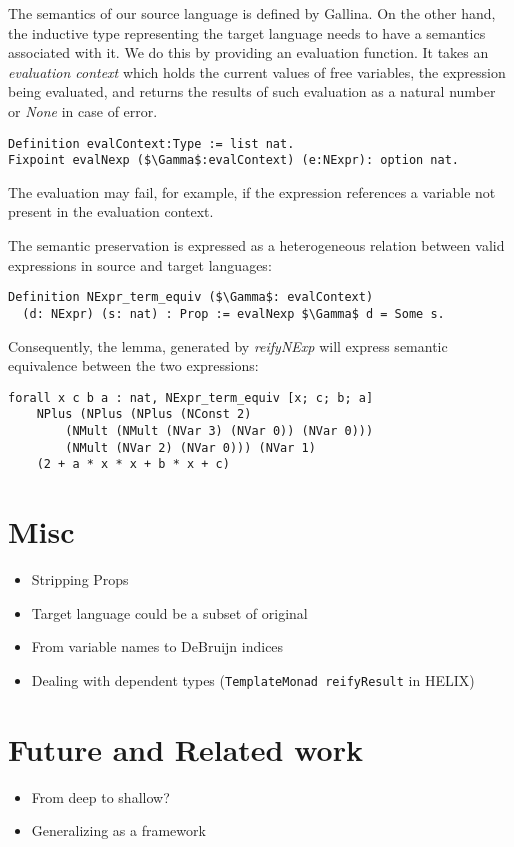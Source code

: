 \documentclass[sigplan]{acmart}\settopmatter{printfolios=true,printccs=false,printacmref=false}
\begin{document}
The semantics of our source language is defined by Gallina. On the
other hand, the inductive type representing the target language needs
to have a semantics associated with it. We do this by providing an
evaluation function. It takes an \textit{evaluation context} which
holds the current values of free variables, the expression being
evaluated, and returns the results of such evaluation as a natural
number or \emph{None} in case of error.

\begin{lstlisting}[language=Coq, mathescape=true,
  frame=single, basicstyle=\footnotesize]
Definition evalContext:Type := list nat.
Fixpoint evalNexp ($\Gamma$:evalContext) (e:NExpr): option nat.
\end{lstlisting}

The evaluation may fail, for example, if the expression references a
variable not present in the evaluation context.

The semantic preservation is expressed as a heterogeneous relation
between valid expressions in source and target languages:

\begin{lstlisting}[language=Coq, mathescape=true,
  frame=single, basicstyle=\footnotesize]
Definition NExpr_term_equiv ($\Gamma$: evalContext)
  (d: NExpr) (s: nat) : Prop := evalNexp $\Gamma$ d = Some s.
\end{lstlisting}

Consequently, the lemma, generated by \emph{reifyNExp} will express
semantic equivalence between the two expressions:

\begin{lstlisting}[language=Coq, mathescape=true,
  frame=single, basicstyle=\footnotesize]
forall x c b a : nat, NExpr_term_equiv [x; c; b; a]
    NPlus (NPlus (NPlus (NConst 2)
        (NMult (NMult (NVar 3) (NVar 0)) (NVar 0)))
        (NMult (NVar 2) (NVar 0))) (NVar 1)
    (2 + a * x * x + b * x + c)
\end{lstlisting}


\section{Misc}
\begin{itemize}
\item Stripping Props
\item Target language could be a subset of original
\item From variable names to DeBruijn indices
\item Dealing with dependent types (\verb|TemplateMonad reifyResult| in HELIX)
\end{itemize}

\section{Future and Related work}
\begin{itemize}
\item From deep to shallow?
\item Generalizing as a framework
\end{itemize}

%




\nocite{*}


\end{document}
